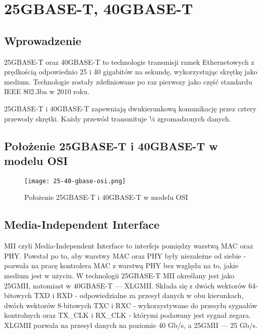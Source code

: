 \section{25GBASE-T, 40GBASE-T}

\subsection{Wprowadzenie}
25GBASE-T oraz 40GBASE-T to technologie transmisji ramek Ethernetowych z prędkością odpowiednio 25 i 40 gigabitów na sekundę, wykorzystując skrętkę jako medium. Technologie zostały zdefiniowane po raz pierwszy jako część standardu IEEE 802.3ba w 2010 roku.

25GBASE-T i 40GBASE-T zapewniają dwukierunkową komunikację przez cztery przewody skrętki. Każdy przewód transmituje ¼ zgromadzonych danych.

\subsection{Położenie 25GBASE-T i 40GBASE-T w modelu OSI}

\begin{figure}[ht]
    \centering
    \texttt{[image: 25-40-gbase-osi.png]}
    \caption{Położenie 25GBASE-T i 40GBASE-T w modelu OSI}
    \label{fig:40gbase-t_osi}
\end{figure}

\subsection{Media-Independent Interface}
MII czyli Media-Independent Interface to interfejs pomiędzy warstwą MAC oraz PHY. Powstał po to, aby warstwy MAC oraz PHY były niezależne od siebie - pozwala na pracę kontrolera MAC z warstwą PHY bez względu na to, jakie medium jest w użyciu.
W technologii 25GBASE-T MII określany jest jako 25GMII, natomiast w 40GBASE-T --- XLGMII. Składa się z dwóch wektorów 64-bitowych TXD i RXD - odpowiedzialne za przesył danych w obu kierunkach, dwóch wektorów 8-bitowych TXC i RXC - wykorzystywane do przesyłu sygnałów kontrolnych oraz TX\_CLK i RX\_CLK - którymi podawany jest sygnał zegara. XLGMII pozwala na przesył danych na poziomie 40 Gb/s, a 25GMII --- 25 Gb/s.


